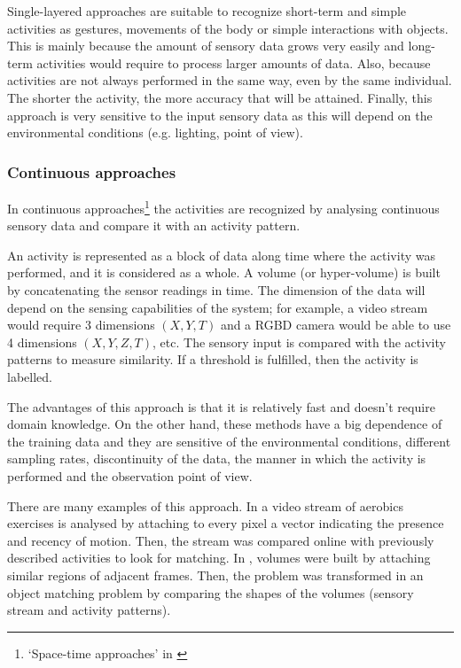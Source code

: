 Single-layered approaches are suitable to recognize short-term and simple activities as gestures, movements of the body or simple interactions with objects. 
This is mainly because the amount of sensory data grows very easily and long-term activities would require to process larger amounts of data. 
Also, because activities are not always performed in the same way, even by the same individual.
The shorter the activity, the more accuracy that will be attained.
Finally, this approach is very sensitive to the input sensory data as this will depend on the environmental conditions (e.g. lighting, point of view).


\subsubsection{Continuous approaches} %

In continuous approaches\footnote{`Space-time approaches' in \citep{Aggarwal11_HumanActivity}} the activities are recognized by analysing continuous sensory data and compare it with an activity pattern.

An activity is represented as a block of data along time where the activity was performed, and it is considered as a whole.
A volume (or hyper-volume) is built by concatenating the sensor readings in time.
The dimension of the data will depend on the sensing capabilities of the system; for example, a video stream would require 3 dimensions $(X,Y,T)$ and a RGBD camera would be able to use 4 dimensions $(X,Y,Z,T)$, etc. %
The sensory input is compared with the activity patterns to measure similarity.
If a threshold is fulfilled, then the activity is labelled.

The advantages of this approach is that it is relatively fast and doesn't require domain knowledge.
On the other hand, these methods have a big dependence of the training data and they are sensitive of the environmental conditions, different sampling rates, discontinuity of the data, the manner in which the activity is performed and the observation point of view. %

There are many examples of this approach.
In \citep{Bobick2001_RecHuMovTemp} a video stream of aerobics exercises is analysed by attaching to every pixel a vector indicating the presence and recency of motion. 
Then, the stream was compared online with previously described activities to look for matching. 
In \citep{Ke2007_SpTmpShapeAR}, volumes were built by attaching similar regions of adjacent frames.
Then, the problem was transformed in an object matching problem by comparing the shapes of the volumes (sensory stream and activity patterns).

